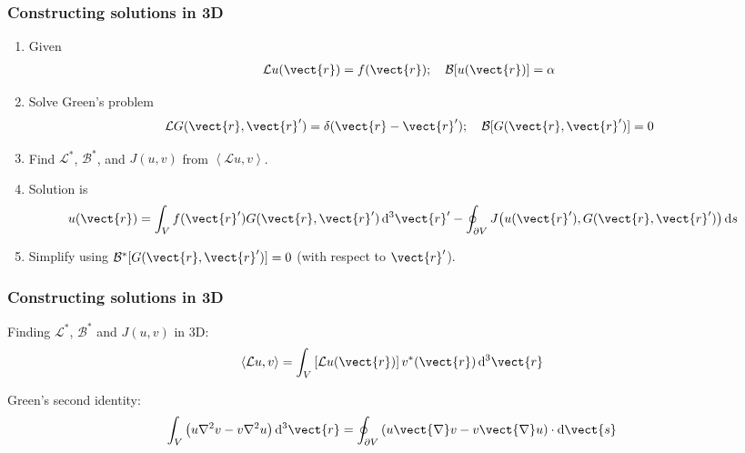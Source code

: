 \documentclass[12 pt, compress, handout, intlimits]{beamer}
\renewcommand{\d}{\operatorname{d}\!}
\renewcommand{\L}{\mathcal{L}}
\renewcommand{\B}{\mathcal{B}}
\newcommand{\inprod}[2]{\left\langle {#1}, {#2} \right\rangle}
\renewcommand{\L}{\mathcal{L}}
\begin{document}
\begin{frame}[fragile]
    \frametitle{Constructing solutions in 3D}
 
    \begin{enumerate}
    \item
        Given
        \begin{align*}
            \L u(\vect{r}) = f(\vect{r}); \quad \B[u(\vect{r})] = \alpha
        \end{align*}
    \item
        Solve Green's problem
        \begin{align*}
            \L G(\vect{r},\vect{r}') = \delta(\vect{r} - \vect{r}'); \quad \B[G(\vect{r},\vect{r}')] = 0
        \end{align*}
    \item
        Find $ \L^* $, $ \B^* $, and $ J(u,v) $ from $ \inprod{\L u}{v} $.
    \item
        Solution is
        \begin{align*}
            u(\vect{r}) &= \int_{V} f(\vect{r}') G(\vect{r},\vect{r}') \d^3 \vect{r}' - \oint_{\partial V} J\big( u(\vect{r}'), G(\vect{r},\vect{r}') \big) \d s
        \end{align*}
    \item
        Simplify using $ \B^*[G(\vect{r},\vect{r}')] = 0 $ (with respect to $ \vect{r}' $).
    \end{enumerate}
       
\end{frame}


\begin{frame}[fragile]
    \frametitle{Constructing solutions in 3D}
    
    Finding $ \L^* $, $ \B^* $ and $ J(u,v) $ in 3D:
    \begin{align*}
        \inprod{\L u}{v} &= \int_V \left[ \L u(\vect{r}) \right] v^*(\vect{r}) \d^3 \vect{r}
    \end{align*}

    Green's second identity:
    \begin{align*}
        \int_V \left( u \nabla^2 v - v \nabla^2 u \right) \d^3 \vect{r} &= \oint_{\partial V} \left( u \vect{\nabla} v - v \vect{\nabla} u \right) \cdot \d \vect{s}
    \end{align*}

\end{frame}
\end{document}
